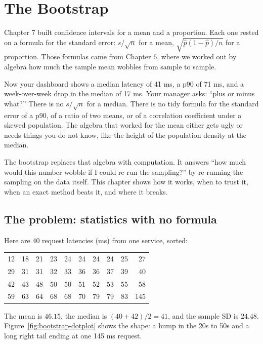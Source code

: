 \chapter{The Bootstrap}
\label{ch:bootstrap}

Chapter 7 built confidence intervals for a mean and a proportion. Each one
rested on a formula for the standard error: $s/\sqrt{n}$ for a mean,
$\sqrt{\hat p(1-\hat p)/n}$ for a proportion. Those formulas came from Chapter 6,
where we worked out by algebra how much the sample mean wobbles from sample to
sample.

Now your dashboard shows a median latency of 41 ms, a p90 of 71 ms, and a
week-over-week drop in the median of 17 ms. Your manager asks: ``plus or minus
what?'' There is no $s/\sqrt{n}$ for a median. There is no tidy formula for
the standard error of a p90, of a ratio of two means, or of a correlation
coefficient under a skewed population. The algebra that worked for the mean
either gets ugly or needs things you do not know, like the height of the
population density at the median.

The bootstrap replaces that algebra with computation. It answers ``how much
would this number wobble if I could re-run the sampling?'' by re-running the
sampling on the data itself. This chapter shows how it works, when to trust it,
when an exact method beats it, and where it breaks.

\section{The problem: statistics with no formula}
\label{sec:boot-problem}

Here are 40 request latencies (ms) from one service, sorted:
\begin{center}
\small
\begin{tabular}{*{10}{r}}
12 & 18 & 21 & 23 & 24 & 24 & 24 & 24 & 25 & 27\\
29 & 31 & 31 & 32 & 33 & 36 & 36 & 37 & 39 & 40\\
42 & 43 & 48 & 50 & 50 & 51 & 52 & 53 & 55 & 58\\
59 & 63 & 64 & 68 & 68 & 70 & 79 & 79 & 83 & 145
\end{tabular}
\end{center}
The mean is $46.15$, the median is $(40+42)/2 = 41$, and the sample SD is
$24.48$. Figure~\ref{fig:bootstrap-dotplot} shows the shape: a hump in the 20s
to 50s and a long right tail ending at one 145 ms request.

